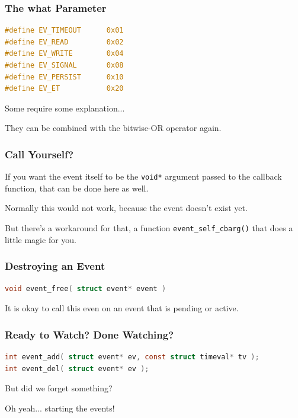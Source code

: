 \begin{frame}[fragile]
	\frametitle{The what Parameter}

	\begin{lstlisting}[language=C]
#define EV_TIMEOUT      0x01
#define EV_READ         0x02
#define EV_WRITE        0x04
#define EV_SIGNAL       0x08
#define EV_PERSIST      0x10
#define EV_ET           0x20
\end{lstlisting}

	Some require some explanation...


	They can be combined with the bitwise-OR operator again.

\end{frame}


\begin{frame}
	\frametitle{Call Yourself?}

	If you want the event itself to be the \texttt{void*} argument passed to the callback function, that can be done here as well.

	Normally this would not work, because the event doesn't exist yet.

	But there's a workaround for that, a function \texttt{event\_self\_cbarg()} that does a little magic for you.

\end{frame}


\begin{frame}[fragile]
	\frametitle{Destroying an Event}
	\begin{lstlisting}[language=C]
void event_free( struct event* event )
\end{lstlisting}

	It is okay to call this even on an event that is pending or active.

\end{frame}


\begin{frame}[fragile]
	\frametitle{Ready to Watch? Done Watching?}

	\begin{lstlisting}[language=C]
int event_add( struct event* ev, const struct timeval* tv );
int event_del( struct event* ev );
\end{lstlisting}

	But did we forget something?

	Oh yeah... starting the events!

\end{frame}


